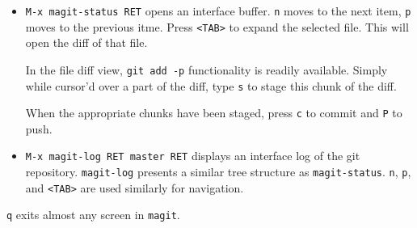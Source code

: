 \documentclass[12pt]{report}
\newcommand\code[1]{{\color{blue}\texttt{#1}}}
\begin{document}
\begin{itemize}
\item \code{M-x magit-status RET} opens an interface buffer. \code{n} moves to
  the next item, \code{p} moves to the previous itme. Press
  \code{<TAB>} to expand the selected file. This will open the diff of
  that file.
    
  In the file diff view, \code{git add -p} functionality is readily
  available. Simply while cursor'd over a part of the diff, type
  \code{s} to stage this chunk of the diff.

  When the appropriate chunks have been staged, press \code{c} to
  commit and \code{P} to push.
  
\item \code{M-x magit-log RET master RET} displays an interface log of
  the git repository. \code{magit-log} presents a similar tree
  structure as \code{magit-status}. \code{n}, \code{p}, and
  \code{<TAB>} are used similarly for navigation.
\end{itemize}

\code{q} exits almost any screen in \code{magit}.
\end{document}
